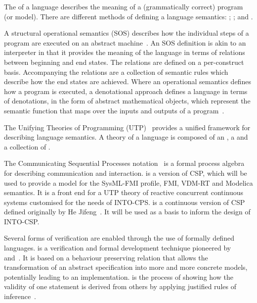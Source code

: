 The  of a language describes the meaning of a (grammatically correct) program~\cite{Nielson&92} (or model). There are different methods of defining a language semantics: ; ; and .

A structural operational semantics (SOS) describes how the individual steps of a program are executed on an abstract machine~\cite{Plotkin81}. An SOS definition is akin to an interpreter in that it provides the meaning of the language in terms of relations between beginning and end states. The relations are defined on a per-construct basis. Accompanying the relations are a collection of semantic rules which describe how the end states are achieved. Where an operational semantics defines how a program is executed, a denotational approach defines a language in terms of denotations, in the form of abstract mathematical objects, which represent the semantic function that maps over the inputs and outputs of a program~\cite{Scott&71}.

The Unifying Theories of Programming (UTP)~\cite{Hoare&98} provides a unified framework for describing language semantics. A theory of a language is composed of an , a  and a collection of .

The Communicating Sequential Processes  notation~\cite{Hoare85} is a formal process algebra for describing  communication  and interaction.
 is a version of CSP, which will be used to provide a model for the SysML-FMI profile, FMI, VDM-RT and Modelica semantics. It is a front end for a UTP theory of reactive concurrent continuous systems customised for the needs of INTO-CPS.  is a continuous version of CSP defined originally by He Jifeng~\cite{Jifeng94}. It will be used as a basis to inform the design of INTO-CSP.

Several forms of verification are enabled through the use of formally defined languages.   is a verification and formal development technique pioneered by~\cite{Back&98} and~\cite{Morgan90a}. It is based on a behaviour preserving relation that allows the transformation of an abstract specification into more and more concrete models, potentially leading to an implementation.  is the process of showing how the validity of one statement is derived from others by applying justified rules of inference~\cite{Bicarregui&94}.

